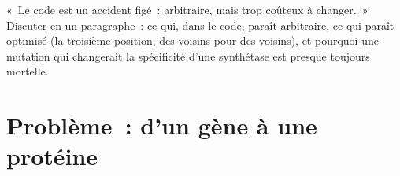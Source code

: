 \begin{exercise}[$\star\star\star$]\label{exo:b1:gene-expression:12}
«~Le code est un accident figé~: arbitraire, mais trop coûteux à
changer.~» Discuter en un paragraphe~: ce qui, dans le code, paraît
arbitraire, ce qui paraît optimisé (la troisième position, des 
voisins pour des  voisins), et pourquoi une mutation qui
changerait la spécificité d'une synthétase est presque toujours
mortelle.
\end{exercise}

\section{Problème~: d'un gène à une protéine}

